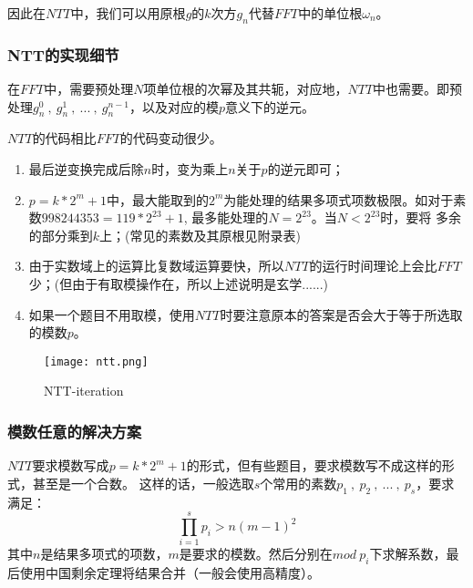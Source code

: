 因此在$NTT$中，我们可以用原根$g$的$k$次方$g_n$代替$FFT$中的单位根$\omega_{n}$。

\subsubsection{NTT的实现细节}
在$FFT$中，需要预处理$N$项单位根的次幂及其共轭，对应地，$NTT$中也需要。即预处理$g_n^0\ ,\ g_n^1\ ,\ ...\ ,\ g_n^{n-1}$，以及对应的模$p$意义下的逆元。

$NTT$的代码相比$FFT$的代码变动很少。
\begin{note}
\begin{enumerate}
\item 最后逆变换完成后除$n$时，变为乘上$n$关于$p$的逆元即可；
\item $p=k*2^m + 1$中，最大能取到的$2^m$为能处理的结果多项式项数极限。如对于素数$998244353= 119 * 2^{23} + 1$, 最多能处理的$N = 2^{23}$。当$N<2^{23}$时，要将
多余的部分乘到$k$上；(常见的素数及其原根见附录表)
\item 由于实数域上的运算比复数域运算要快，所以$NTT$的运行时间理论上会比$FFT$少；(但由于有取模操作在，所以上述说明是玄学......)
\item 如果一个题目不用取模，使用$NTT$时要注意原本的答案是否会大于等于所选取的模数$p$。
\end{enumerate}
\end{note}

\begin{figure}[!htbp]
	\centering
	\texttt{[image: ntt.png]}
	\caption{NTT-iteration \label{fig:ntt}}
\end{figure}



\subsubsection{模数任意的解决方案}
$NTT$要求模数写成$p=k*2^m + 1$的形式，但有些题目，要求模数写不成这样的形式，甚至是一个合数。
这样的话，一般选取$s$个常用的素数$p_1\ ,\ p_2\ ,\ ...\ ,\ p_s$，要求满足：
$$
\prod_{i=1}^s p_i > n(m-1)^2
$$
其中$n$是结果多项式的项数，$m$是要求的模数。然后分别在$mod\ p_i$下求解系数，最后使用中国剩余定理将结果合并（一般会使用高精度）。




